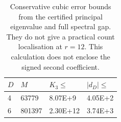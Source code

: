 \begin{table}[htbp]
\centering
\caption{Conservative cubic error bounds from the certified principal eigenvalue and full spectral gap. They do not give a practical count localisation at $r=12$. This calculation does not enclose the signed second coefficient.}
\label{tab:second_budgets}
\begin{tabular}{llll}
\toprule
$D$ & $M$ & $K_3\leq$ & $|d_D|\leq$ \\
\midrule
4 & 63779 & 8.07E+9 & 4.05E+2 \\
6 & 801397 & 2.30E+12 & 3.74E+3 \\
\bottomrule
\end{tabular}
\end{table}
